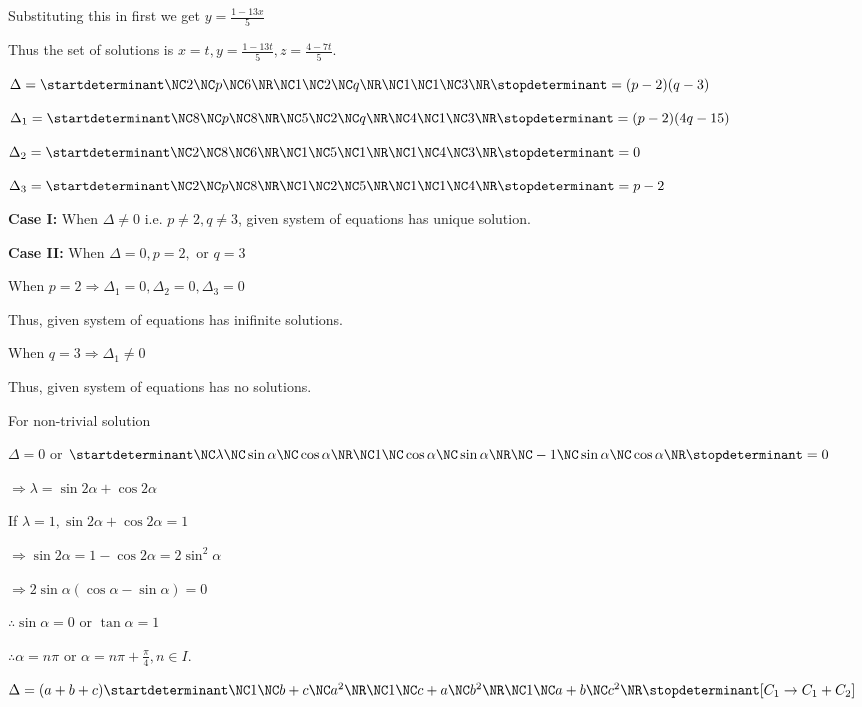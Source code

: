   Substituting this in first we get $y = \frac{1 - 13x}{5}$

  Thus the set of solutions is $x = t, y = \frac{1 - 13t}{5}, z = \frac{4 - 7t}{5}$.
\item $\Delta = \startdeterminant\NC2 \NC p \NC 6 \NR\NC 1 \NC 2 \NC q \NR\NC 1 \NC 1 \NC
  3\NR\stopdeterminant = (p - 2)(q - 3)$

  $\Delta_1 = \startdeterminant\NC8 \NC p \NC 8 \NR\NC 5 \NC 2 \NC q \NR\NC 4 \NC 1 \NC
  3\NR\stopdeterminant = (p - 2)(4q - 15)$

  $\Delta_2 = \startdeterminant\NC 2 \NC 8 \NC 6 \NR\NC 1 \NC 5 \NC 1 \NR\NC 1 \NC 4 \NC
  3\NR\stopdeterminant = 0$

  $\Delta_3 = \startdeterminant\NC2 \NC p \NC 8 \NR\NC 1 \NC 2 \NC 5 \NR\NC 1 \NC 1 \NC
  4\NR\stopdeterminant = p -2$

  {\bf Case I:} When $\Delta \neq 0$ i.e. $p \neq 2, q\neq 3$, given system of equations has unique
  solution.

  {\bf Case II:} When $\Delta = 0, p = 2,$ or $q = 3$

  When $p = 2 \Rightarrow \Delta_1 = 0, \Delta_2 = 0, \Delta_3 = 0$

  Thus, given system of equations has inifinite solutions.

  When $q = 3\Rightarrow \Delta_1\neq 0$

  Thus, given system of equations has no solutions.
\item For non-trivial solution

  $\Delta = 0$ or $\startdeterminant\NC\lambda \NC \sin\alpha \NC
  \cos\alpha \NR\NC 1 \NC \cos\alpha \NC \sin\alpha \NR\NC -1 \NC \sin\alpha \NC \cos\alpha
  \NR\stopdeterminant = 0$

  $\Rightarrow \lambda = \sin 2\alpha + \cos 2\alpha$

  If $\lambda = 1, \sin 2\alpha + \cos 2\alpha = 1$

  $\Rightarrow \sin 2\alpha = 1 - \cos 2\alpha = 2\sin^2\alpha$

  $\Rightarrow 2\sin\alpha(\cos\alpha - \sin\alpha) = 0$

  $\therefore \sin\alpha = 0$ or $\tan\alpha = 1$

  $\therefore \alpha = n\pi$ or $\alpha = n\pi + \frac{\pi}{4}, n\in I$.
\item $\Delta = (a + b + c)\startdeterminant\NC 1 \NC b + c \NC a^2 \NR\NC 1 \NC c + a \NC b^2 \NR\NC 1
  \NC a + b \NC c^2\NR\stopdeterminant[C_1\rightarrow C_1 + C_2]$

